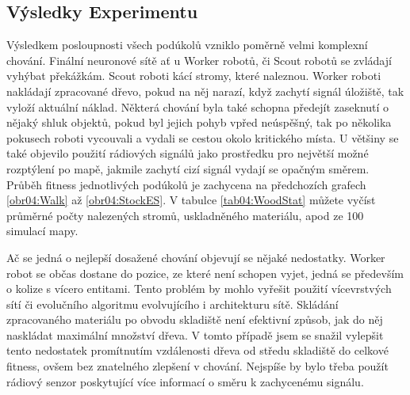 	\subsection{Výsledky Experimentu}
	Výsledkem posloupnosti všech podúkolů vzniklo poměrně velmi komplexní chování. Finální neuronové sítě ať u Worker robotů, či Scout robotů se zvládají vyhýbat překážkám. Scout roboti kácí stromy, které naleznou. Worker roboti nakládají zpracované dřevo, pokud na něj narazí, když zachytí signál úložiště, tak vyloží aktuální náklad. Některá chování byla také schopna předejít zaseknutí o nějaký shluk objektů, pokud byl  jejich pohyb vpřed neúspěšný, tak po několika pokusech roboti vycouvali a vydali se cestou okolo kritického místa. U většiny se také objevilo použití rádiových signálů jako prostředku pro největší možné rozptýlení po mapě, jakmile zachytí cizí signál vydají se opačným směrem. Průběh fitness jednotlivých podúkolů je zachycena na předchozích grafech \ref{obr04:Walk} až \ref{obr04:StockES}. V tabulce \ref{tab04:WoodStat} můžete vyčíst průměrné počty nalezených stromů, uskladněného materiálu, apod ze 100 simulací mapy. 
	
	Ač se jedná o nejlepší dosažené chování objevují se nějaké nedostatky. Worker robot se občas dostane do pozice, ze které není schopen vyjet, jedná se především o kolize s vícero entitami. Tento problém by mohlo vyřešit použití vícevrstvých sítí či evolučního algoritmu evolvujícího i architekturu sítě. Skládání zpracovaného materiálu po obvodu skladiště není efektivní způsob, jak do něj naskládat maximální množství dřeva. V tomto případě jsem se snažil vylepšit tento nedostatek promítnutím vzdálenosti dřeva od středu skladiště do celkové fitness, ovšem bez znatelného zlepšení v chování. Nejspíše by bylo třeba použít rádiový senzor poskytující více informací o směru k zachycenému signálu. 
	
